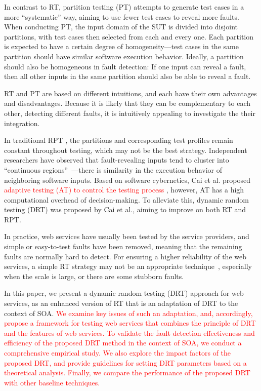 \documentclass[10pt,journal,compsoc]{IEEEtran}
\begin{document}
In contrast to RT, partition testing (PT) attempts to generate test cases in a more ``systematic'' way, aiming to use fewer test cases to reveal more faults.
When conducting PT, the input domain of the SUT is divided into disjoint partitions, with test cases then selected from each and every one.
Each partition is expected to have a certain degree of homogeneity---test cases in the same partition should have similar software execution behavior.
Ideally, a partition should also be homogeneous in fault detection:
If one input can reveal a fault, then all other inputs in the same partition should also be able to reveal a fault.

RT and PT are based on different intuitions, and each have their own advantages and disadvantages.
Because it is likely that they can be complementary to each other, detecting different faults, it is intuitively appealing to investigate the their integration.

In traditional RPT \cite{cai2009random}, the partitions and corresponding test profiles remain constant throughout testing, which may not be the best strategy.
Independent researchers have observed that fault-revealing inputs tend to cluster into ``continuous regions''~\cite{Ammann88, Finelli91}---there is similarity in the execution behavior of neighboring software inputs.
Based on software cybernetics, Cai et al. proposed \textcolor{red}{adaptive testing (AT) to control the testing process \cite{cai2004optimal}}, however, AT has a high computational overhead of decision-making. To alleviate this, dynamic random testing (DRT) \cite{cai2009random} was proposed by Cai et al., aiming to improve on both RT and RPT.

In practice, web services have usually been tested by the service providers, and simple or easy-to-test faults have been removed, meaning that the remaining faults are normally hard to detect.
For ensuring a higher reliability of the web services, a simple RT strategy may not be an appropriate technique~\cite{li2014two}, especially when the scale is large, or there are some stubborn faults.

In this paper, we present a dynamic random testing (DRT) approach for web services, as an enhanced version of RT that is an adaptation of DRT to the context of SOA.
\textcolor{red}{We examine key issues of such an adaptation, and, accordingly, propose a framework for testing web services that combines the principle of DRT \cite{cai2009random} and the features of web services. To validate the fault detection effectiveness and efficiency of the proposed DRT method in the context of SOA, we conduct a comprehensive empirical study. We also explore the impact factors of the proposed DRT, and provide guidelines for setting DRT parameters based on a theoretical analysis. Finally, we compare the performance of the proposed DRT with other baseline techniques.}
\end{document}
